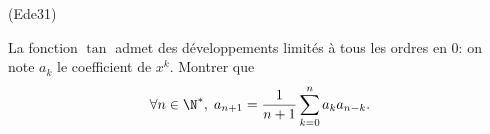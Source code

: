 \begin{tiny}(Ede31)\end{tiny} La fonction $\tan$ admet des développements limités à tous les ordres en $0$: on note $a_k$ le coefficient de $x^k$. 
Montrer que
\[
 \forall n\in \N^{*}, \;
 a_{n+1} = \frac{1}{n+1} \sum_{k = 0}^{n}a_k a_{n-k}.
\]
